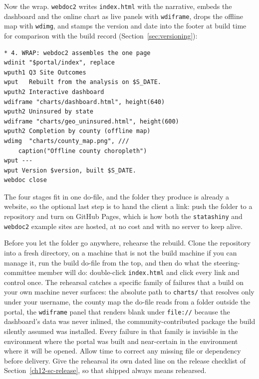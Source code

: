 \documentclass[
    a4paper,
    fontsize=10pt,
    twoside=true,
    numbers=noenddot,
]{kaobook}
\begin{document}
Now the wrap. \texttt{webdoc2} writes \texttt{index.html} with the narrative, embeds the dashboard and the online chart as live panels with \texttt{wdiframe}, drops the offline map with \texttt{wdimg}, and stamps the version and date into the footer at build time for comparison with the build record (Section~\ref{sec:versioning}):
\par
{\footnotesize
\begin{verbatim}
* 4. WRAP: webdoc2 assembles the one page
wdinit "$portal/index", replace
wputh1 Q3 Site Outcomes
wput   Rebuilt from the analysis on $S_DATE.
wputh2 Interactive dashboard
wdiframe "charts/dashboard.html", height(640)
wputh2 Uninsured by state
wdiframe "charts/geo_uninsured.html", height(600)
wputh2 Completion by county (offline map)
wdimg  "charts/county_map.png", ///
    caption("Offline county choropleth")
wput ---
wput Version $version, built $S_DATE.
webdoc close
\end{verbatim}
}
The four stages fit in one do-file, and the folder they produce is already a website, so the optional last step is to hand the client a link: push the folder to a repository and turn on GitHub Pages, which is how both the \texttt{statashiny} and \texttt{webdoc2} example sites are hosted, at no cost and with no server to keep alive.

Before you let the folder go anywhere, rehearse the rebuild. Clone the repository into a fresh directory, on a machine that is not the build machine if you can manage it, run the build do-file from the top, and then do what the steering-committee member will do: double-click \texttt{index.html} and click every link and control once. The rehearsal catches a specific family of failures that a build on your own machine never surfaces: the absolute path to \texttt{charts/} that resolves only under your username, the county map the do-file reads from a folder outside the portal, the \texttt{wdiframe} panel that renders blank under \texttt{file://} because the dashboard's data was never inlined, the community-contributed package the build silently assumed was installed. Every failure in that family is invisible in the environment where the portal was built and near-certain in the environment where it will be opened. Allow time to correct any missing file or dependency before delivery. Give the rehearsal its own dated line on the release checklist of Section~\ref{ch12-sc-release}, so that shipped always means rehearsed.
\end{document}
